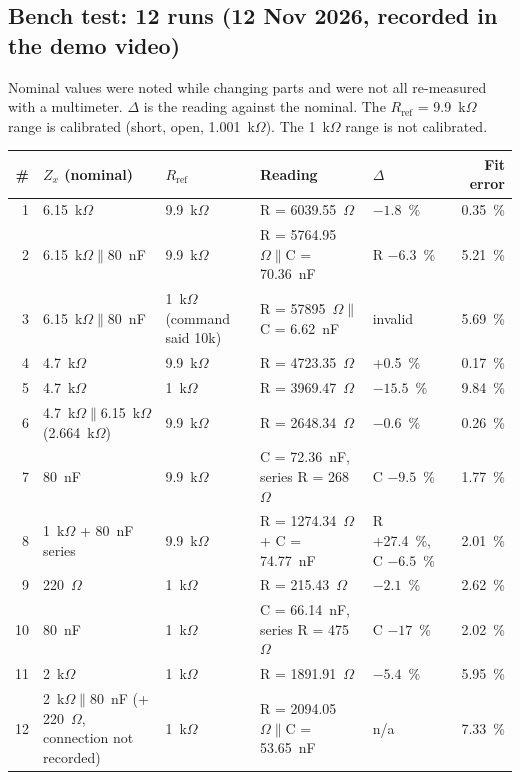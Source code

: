 \documentclass[11pt,a4paper]{article}
\newcommand{\Rref}{R_{\mathrm{ref}}}
\newcommand{\Zx}{Z_x}
\begin{document}
\subsection{Bench test: 12 runs (12 Nov 2026, recorded in the demo video)}
{\small Nominal values were noted while changing parts and were not all re-measured with a multimeter. $\Delta$ is the reading against the nominal. The $\Rref$ = 9.9~k$\Omega$ range is calibrated (short, open, 1.001~k$\Omega$). The 1~k$\Omega$ range is not calibrated.}

\begin{center}
\small
\begin{tabular}{r p{3.6cm} p{2.0cm} p{4.4cm} p{2.2cm} r}
\toprule
\# & $\Zx$ (nominal) & $\Rref$ & Reading & $\Delta$ & Fit error \\
\midrule
1  & 6.15~k$\Omega$ & 9.9~k$\Omega$ & R = 6039.55~$\Omega$ & $-1.8$~\% & 0.35~\% \\
2  & 6.15~k$\Omega\|$80~nF & 9.9~k$\Omega$ & R = 5764.95~$\Omega\|$C = 70.36~nF & R $-6.3$~\% & 5.21~\% \\
3  & 6.15~k$\Omega\|$80~nF & 1~k$\Omega$ (command said 10k) & R = 57895~$\Omega\|$C = 6.62~nF & invalid & 5.69~\% \\
4  & 4.7~k$\Omega$ & 9.9~k$\Omega$ & R = 4723.35~$\Omega$ & +0.5~\% & 0.17~\% \\
5  & 4.7~k$\Omega$ & 1~k$\Omega$ & R = 3969.47~$\Omega$ & $-15.5$~\% & 9.84~\% \\
6  & 4.7~k$\Omega\|$6.15~k$\Omega$ (2.664~k$\Omega$) & 9.9~k$\Omega$ & R = 2648.34~$\Omega$ & $-0.6$~\% & 0.26~\% \\
7  & 80~nF & 9.9~k$\Omega$ & C = 72.36~nF, series R = 268~$\Omega$ & C $-9.5$~\% & 1.77~\% \\
8  & 1~k$\Omega$ + 80~nF series & 9.9~k$\Omega$ & R = 1274.34~$\Omega$ + C = 74.77~nF & R +27.4~\%, C $-6.5$~\% & 2.01~\% \\
9  & 220~$\Omega$ & 1~k$\Omega$ & R = 215.43~$\Omega$ & $-2.1$~\% & 2.62~\% \\
10 & 80~nF & 1~k$\Omega$ & C = 66.14~nF, series R = 475~$\Omega$ & C $-17$~\% & 2.02~\% \\
11 & 2~k$\Omega$ & 1~k$\Omega$ & R = 1891.91~$\Omega$ & $-5.4$~\% & 5.95~\% \\
12 & 2~k$\Omega\|$80~nF (+ 220~$\Omega$, connection not recorded) & 1~k$\Omega$ & R = 2094.05~$\Omega\|$C = 53.65~nF & n/a & 7.33~\% \\
\bottomrule
\end{tabular}
\end{center}
\end{document}
